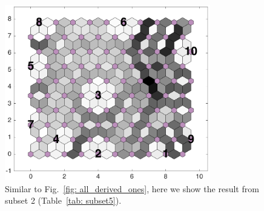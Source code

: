 \begin{figure}
        \centering
        \includegraphics[width=0.8\textwidth]{../../images0.01/M31/2D/image_subsets/subset5_dist_with_hits_t.png}
    \caption{Similar to Fig.~\ref{fig: all_derived_ones}, here we show the result from subset 2 (Table~\ref{tab: subset5}).}
    \label{fig: subset5}
\end{figure}